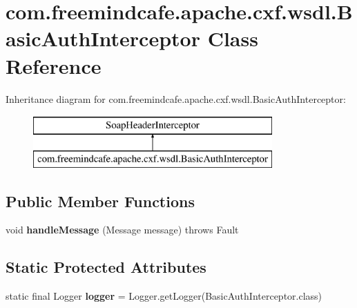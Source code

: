 \hypertarget{classcom_1_1freemindcafe_1_1apache_1_1cxf_1_1wsdl_1_1_basic_auth_interceptor}{}\section{com.\+freemindcafe.\+apache.\+cxf.\+wsdl.\+Basic\+Auth\+Interceptor Class Reference}
\label{classcom_1_1freemindcafe_1_1apache_1_1cxf_1_1wsdl_1_1_basic_auth_interceptor}
Inheritance diagram for com.\+freemindcafe.\+apache.\+cxf.\+wsdl.\+Basic\+Auth\+Interceptor\+:\begin{figure}[H]
\begin{center}
\leavevmode
\includegraphics[height=2.000000cm]{classcom_1_1freemindcafe_1_1apache_1_1cxf_1_1wsdl_1_1_basic_auth_interceptor}
\end{center}
\end{figure}
\subsection*{Public Member Functions}
\begin{DoxyCompactItemize}
\item 
\hypertarget{classcom_1_1freemindcafe_1_1apache_1_1cxf_1_1wsdl_1_1_basic_auth_interceptor_a899f06e64e5d70c67d39d5775a4b8fd8}{}void {\bfseries handle\+Message} (Message message)  throws Fault \label{classcom_1_1freemindcafe_1_1apache_1_1cxf_1_1wsdl_1_1_basic_auth_interceptor_a899f06e64e5d70c67d39d5775a4b8fd8}

\end{DoxyCompactItemize}
\subsection*{Static Protected Attributes}
\begin{DoxyCompactItemize}
\item 
\hypertarget{classcom_1_1freemindcafe_1_1apache_1_1cxf_1_1wsdl_1_1_basic_auth_interceptor_a40801ed056da042f09c717f0ba737bad}{}static final Logger {\bfseries logger} = Logger.\+get\+Logger(Basic\+Auth\+Interceptor.\+class)\label{classcom_1_1freemindcafe_1_1apache_1_1cxf_1_1wsdl_1_1_basic_auth_interceptor_a40801ed056da042f09c717f0ba737bad}

\end{DoxyCompactItemize}


